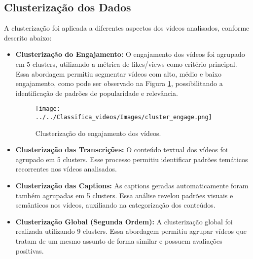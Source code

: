 \documentclass[manuscript,screen,review]{acmart}
\begin{document}
\subsection{Clusterização dos Dados}

A clusterização foi aplicada a diferentes aspectos dos vídeos analisados, conforme descrito abaixo:

\begin{itemize}
    \item \textbf{Clusterização do Engajamento:} 
    O engajamento dos vídeos foi agrupado em 5 clusters, utilizando a métrica de likes/views como critério principal. Essa abordagem permitiu segmentar vídeos com alto, médio e baixo engajamento, como pode ser observado na Figura \ref{fig:cluster_engage}, possibilitando a identificação de padrões de popularidade e relevância.

    \begin{figure}[h]
        \centering
        \texttt{[image: ../../Classifica\_videos/Images/cluster\_engage.png]}
        \caption{Clusterização do engajamento dos vídeos.}
        \label{fig:cluster_engage}
    \end{figure}

    \item \textbf{Clusterização das Transcrições:} 
    O conteúdo textual dos vídeos foi agrupado em 5 clusters. Esse processo permitiu identificar padrões temáticos recorrentes nos vídeos analisados.

    \item \textbf{Clusterização das Captions:} 
    As captions geradas automaticamente foram também agrupadas em 5 clusters. Essa análise revelou padrões visuais e semânticos nos vídeos, auxiliando na categorização dos conteúdos.

    \item \textbf{Clusterização Global (Segunda Ordem):} 
    A clusterização global foi realizada utilizando 9 clusters. Essa abordagem permitiu agrupar vídeos que tratam de um mesmo assunto de forma similar e possuem avaliações positivas.
\end{itemize}
\end{document}
